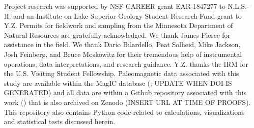 \documentclass[draft]{agujournal2019}
\begin{document}
\acknowledgments
Project research was supported by NSF CAREER grant EAR-1847277 to N.L.S.-H. and an Institute on Lake Superior Geology Student Research Fund grant to Y.Z. Permits for fieldwork and sampling from the Minnesota Department of Natural Resources are gratefully acknowledged. We thank James Pierce for assistance in the field.
We thank Dario Bilardello, Peat Solheid, Mike Jackson, Josh Feinberg, and Bruce Moskowitz for their tremendous help of instrumental operations, data interpretations, and research guidance. Y.Z. thanks the IRM for the U.S. Visiting Student Fellowship. Paleomagnetic data associated with this study are available within the MagIC database (\url{}; UPDATE WHEN DOI IS GENERATED) and all data are within a Github repository associated with this work (\url{}) that is also archived on Zenodo (INSERT URL AT TIME OF PROOFS). This repository also contains Python code related to calculations, visualizations and statistical tests discussed herein.  


\end{document}
